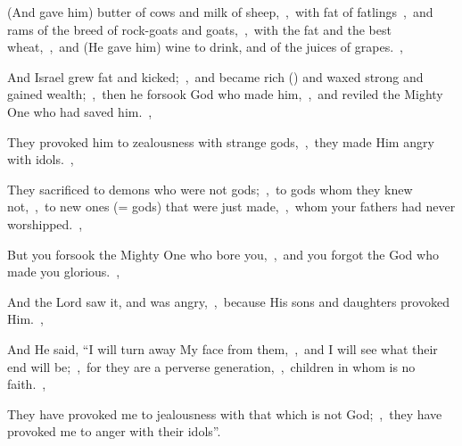 \documentclass[12pt,twoside,a5paper]{article}
\begin{document}
\begin{normalparskip}
  (And gave him) butter of cows and milk of sheep,~\sep\ with fat of fatlings~\sep\ and rams of the breed of rock-goats and goats,~\sep\ with the fat and the best wheat,~\sep\ and (He gave him) wine to drink, and of the juices of grapes.~\sep

  And Israel grew fat and kicked;~\sep\ and became rich () and waxed strong and gained wealth;~\sep\ then he forsook God who made him,~\sep\ and reviled the Mighty One who had saved him.~\sep

  They provoked him to zealousness with strange gods,~\sep\ they made Him angry with idols.~\sep

  They sacrificed to demons who were not gods;~\sep\ to gods whom they knew not,~\sep\ to new ones (= gods) that were just made,~\sep\ whom your fathers had never worshipped.~\sep

  But you forsook the Mighty One who bore you,~\sep\ and you forgot the God who made you glorious.~\sep

  And the Lord saw it, and was angry,~\sep\ because His sons and daughters provoked Him.~\sep

  And He said, ``I will turn away My face from them,~\sep\ and I will see what their end will be;~\sep\ for they are a perverse generation,~\sep\ children in whom is no faith.~\sep

  They have provoked me to jealousness with that which is not God;~\sep\ they have provoked me to anger with their idols''.
\end{normalparskip}


\end{document}
